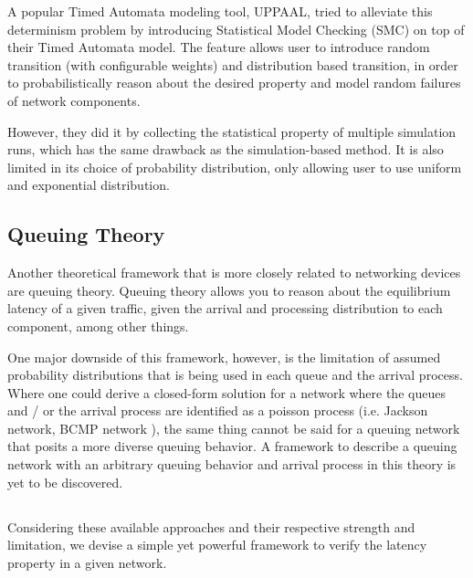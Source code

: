 A popular Timed Automata modeling tool, UPPAAL, tried to alleviate this determinism problem by 
introducing Statistical Model Checking (SMC) on top of their Timed Automata model. 
The feature allows user to introduce random transition (with configurable weights) and distribution 
based transition, in order to probabilistically reason about the desired property and model 
random failures of network components.

However, they did it by collecting the statistical property of multiple simulation runs, which 
has the same drawback as the simulation-based method. 
It is also limited in its choice of probability distribution, only allowing user to use uniform and 
exponential distribution.

\subsection{Queuing Theory}
Another theoretical framework that is more closely related to networking devices are queuing 
theory.
Queuing theory allows you to reason about the equilibrium latency of a given traffic, given the 
arrival and processing distribution to each component, among other things.

One major downside of this framework, however, is the limitation of assumed probability 
distributions that is being used in each queue and the arrival process. 
Where one could derive a closed-form solution for a network where the queues and / or the arrival process 
are identified as a poisson process (i.e. Jackson network, BCMP network \cite{bcmp}), 
the same thing cannot be said for a queuing network that posits a more diverse queuing behavior.
A framework to describe a queuing network with an arbitrary queuing behavior and arrival process in this 
theory is yet to be discovered.

\subsection{\tool}

Considering these available approaches and their respective strength and limitation, we devise a 
simple yet powerful framework to verify the latency property in a given network.

